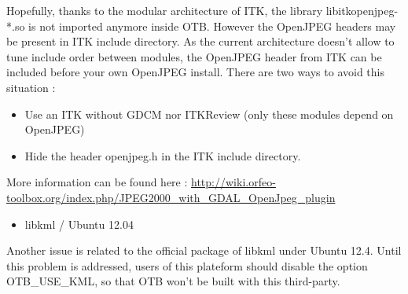 Hopefully, thanks to the modular architecture of ITK, the library libitkopenjpeg-*.so is not imported anymore inside OTB.
However the OpenJPEG headers may be present in ITK include directory. As the current architecture doesn't allow to tune 
include order between modules, the OpenJPEG header from ITK can be included before your own OpenJPEG install. There are
two ways to avoid this situation :
\begin{itemize}
\item Use an ITK without GDCM nor ITKReview (only these modules depend on OpenJPEG)
\item Hide the header openjpeg.h in the ITK include directory.
\end{itemize}

More information can be found here : \url{http://wiki.orfeo-toolbox.org/index.php/JPEG2000_with_GDAL_OpenJpeg_plugin}

\begin{itemize}
\item  libkml / Ubuntu 12.04 
\end{itemize}

Another issue is related to the official package of libkml under Ubuntu 12.4.
Until this problem is addressed, users of this plateform should disable the option OTB\_USE\_KML, so that OTB won't be built with this third-party.

